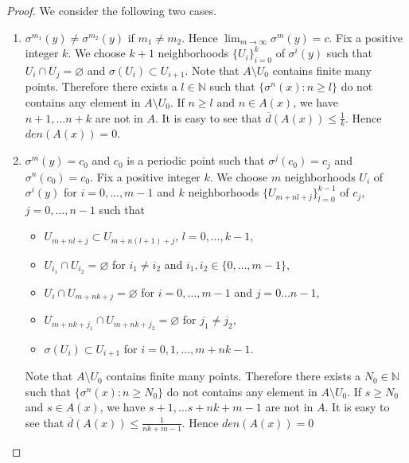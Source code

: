 \documentclass[a4paper,10pt]{amsart}
\newcommand{\N}{\mathbb N} %
\begin{document}
\begin{proof}
   We consider the following two cases.
   \begin{enumerate}
       \item $\sigma^{m_1}(y) \neq \sigma^{m_2}(y)$ if $m_1 \neq m_2$.
           Hence $\lim_{m \rightarrow \infty}\sigma^{m}(y) = c$. Fix a positive
           integer $k$. We choose $k+1$ neighborhoods $\{U_i \}_{i=0}^{k}$ of 
           $\sigma^{i}(y)$ such that $U_{i} \cap U_{j} = \varnothing$ and 
           $\sigma(U_i) \subset U_{i+1}$. Note that $A \setminus U_{0}$ contains 
           finite many points. Therefore there exists a $l \in \N$ such that 
           $\{\sigma^{n}(x) : n \geq l\}$ do not contains any element in 
           $A \setminus U_{0}$. If $n \geq l$ and $n \in A(x)$, we have
           $n+1, \ldots n+k$ are not in $A$. It is easy to see that
           $\overline{d}(A(x)) \leq \frac{1}{k}$. Hence $den(A(x)) = 0$. 
       \item $\sigma^{m}(y) = c_0$ and $c_0$ is a periodic point such that 
           $\sigma^{j}(c_0) = c_{j}$ and $\sigma^{n}(c_0) = c_0$. 
           Fix a positive integer $k$. We choose
           $m$ neighborhoods $U_i$ of $\sigma^{i}(y)$ for $i = 0, \ldots, m-1$
           and $k$ neighborhoods $\{U_{m + nl+ j} \}_{l=0}^{k-1}$ of $c_j$, 
           $j = 0, \ldots, n-1$ such that
           \begin{itemize}
               \item $U_{m + nl+ j}\subset U_{m + n(l+1)+ j}$, $l = 0, \ldots, k-1$,
                \item $U_{i_1} \cap U_{i_2} = \varnothing$ 
                    for $i_1 \neq i_2$ and $i_1, i_2 \in
                    \{0, \ldots, m-1\}$, 
                \item $U_i \cap U_{m + nk+ j} = \varnothing$ for 
                    $i = 0, \ldots, m-1$ and $j = 0 \ldots n-1$,
                \item $U_{m + nk+ j_1} \cap U_{m + nk+ j_2}= \varnothing$ 
                    for $j_1 \neq j_2$,
                \item $\sigma(U_i) \subset U_{i+1}$ for $i = 0, 1, \ldots, m+nk-1$.
            \end{itemize} 
           Note that $A \setminus U_{0}$ contains 
           finite many points. Therefore there exists a $N_0 \in \N$ such that 
           $\{\sigma^{n}(x) : n \geq N_0\}$ do not contains any element in 
           $A \setminus U_{0}$. If $s \geq N_0$ and $s \in A(x)$, we have
           $s+1, \ldots s+nk+m-1$ are not in $A$. It is easy to see that
           $\overline{d}(A(x)) \leq \frac{1}{nk+m-1}$. Hence $den(A(x)) = 0$ 
    \end{enumerate}
\end{proof}
\end{document}
